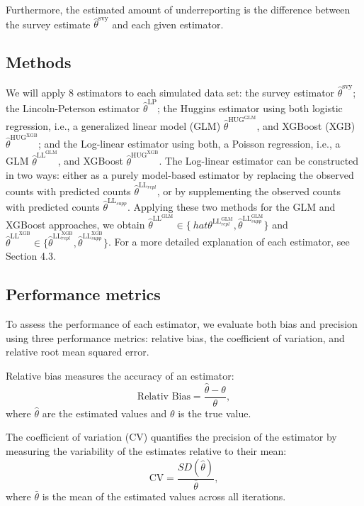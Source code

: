 \documentclass[12pt, a4paper]{article}
\begin{document}
Furthermore, the estimated amount of underreporting is the difference between the survey estimate $\hat\theta^{\text{svy}}$ and each given estimator. 

\subsection{Methods}
\noindent We will apply 8 estimators to each simulated data set: the survey estimator $\hat\theta^{\text{svy}}$; the Lincoln-Peterson estimator $\hat\theta^{\text{LP}}$; the Huggins estimator using both logistic regression, i.e., a generalized linear model (GLM) $\hat\theta^{\text{HUG}^{\text{GLM}}}$, and XGBoost (XGB) $\hat\theta^{\text{HUG}^{\text{XGB}}}$; and the Log-linear estimator using both, a Poisson regression, i.e., a GLM $\hat\theta^{\text{LL}^{\text{GLM}}}$, and XGBoost $\hat\theta^{\text{HUG}^{\text{XGB}}}$. The Log-linear estimator can be constructed in two ways: either as a purely model-based estimator by replacing the observed counts with predicted counts $\hat\theta^{\text{LL}_{repl}}$, or by supplementing the observed counts with predicted counts $\hat\theta^{\text{LL}_{supp}}$. Applying these two methods for the GLM and XGBoost approaches, we obtain $\hat\theta^{\text{LL}^{\text{GLM}}} \in \{\ hat\theta^{\text{LL}^{\text{GLM}}_{repl}}, \hat\theta^{\text{LL}^{\text{GLM}}_{supp}} \}$ and $\hat\theta^{\text{LL}^{\text{XGB}}} \in \{ \hat\theta^{\text{LL}^{\text{XGB}}_{repl}}, \hat\theta^{\text{LL}^{\text{XGB}}_{supp}} \}$. For a more detailed explanation of each estimator, see Section 4.3.

\subsection{Performance metrics}
\noindent To assess the performance of each estimator, we evaluate both bias and precision using three performance metrics: relative bias, the coefficient of variation, and relative root mean squared error. \par

Relative bias measures the accuracy of an estimator:
$$\text{Relativ Bias} = \frac{\hat\theta - \theta}{\theta},$$ 
\noindent where $\hat\theta$ are the estimated values and $\theta$ is the true value. \par

The coefficient of variation (CV) quantifies the precision of the estimator by measuring the variability of the estimates relative to their mean: $$\text{CV} = \frac{SD(\hat\theta)}{\bar\theta},$$
\noindent where $\bar\theta$ is the mean of the estimated values across all iterations. \par
\end{document}

